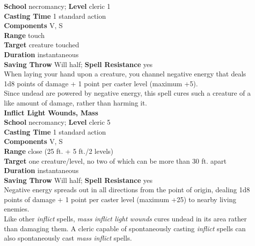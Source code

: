 \textbf{School} necromancy; \textbf{Level} cleric 1\\
\textbf{Casting Time} 1 standard action\\
\textbf{Components} V, S\\
\textbf{Range} touch\\
\textbf{Target} creature touched\\
\textbf{Duration} instantaneous\\
\textbf{Saving Throw }Will half; \textbf{Spell Resistance} yes\\
When laying your hand upon a creature, you channel negative energy that deals 1d8 points of damage + 1 point per caster level (maximum +5).\\
Since undead are powered by negative energy, this spell cures such a creature of a like amount of damage, rather than harming it.\\
\textbf{Inflict Light Wounds, Mass}\\
\textbf{School} necromancy; \textbf{Level} cleric 5\\
\textbf{Casting Time} 1 standard action\\
\textbf{Components} V, S\\
\textbf{Range} close (25 ft. + 5 ft./2 levels)\\
\textbf{Target} one creature/level, no two of which can be more than 30 ft. apart\\
\textbf{Duration} instantaneous\\
\textbf{Saving Throw }Will half; \textbf{Spell Resistance} yes\\
Negative energy spreads out in all directions from the point of origin, dealing 1d8 points of damage + 1 point per caster level (maximum +25) to nearby living enemies.\\
Like other \textit{inflict }spells, \textit{mass inflict light wounds }cures undead in its area rather than damaging them. A cleric capable of spontaneously casting \textit{inflict }spells can also spontaneously cast \textit{mass inflict }spells.\\
